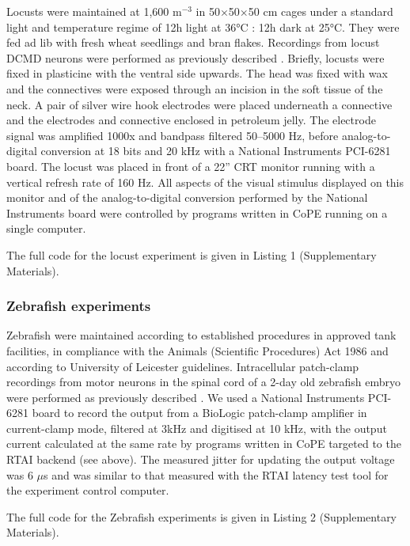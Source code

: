 Locusts were maintained at 1,600 m$^{-3}$ in 50$\times$50$\times$50 cm cages under a
standard light and temperature regime of 12h light at 36°C : 12h dark
at 25°C. They were fed ad lib with fresh wheat seedlings and bran
flakes. Recordings from locust DCMD neurons were performed as
previously described \citep{Matheson2004}. Briefly, locusts were fixed
in plasticine with the ventral side upwards. The head was fixed with
wax
and the connectives were exposed through an
incision in the soft tissue of the neck. A pair of silver wire hook
electrodes were placed underneath a connective and the electrodes
and connective enclosed in petroleum jelly. The electrode signal was
amplified 1000x and bandpass filtered 50--5000 Hz, before
analog-to-digital conversion at 18 bits and 20 kHz with a National
Instruments PCI-6281 board. The locust was placed in front of a 22''
CRT monitor running with a vertical refresh rate of 160 Hz. All
aspects of the visual stimulus displayed on this monitor and of
the analog-to-digital conversion performed by the National Instruments
board were controlled by programs written in
CoPE running on a single computer.

The full code for the locust experiment is given in Listing 1
(Supplementary Materials).

\subsubsection*{Zebrafish experiments}

Zebrafish were maintained according to established procedures
\citep{Westerfield1994} in approved tank facilities, in compliance
with the Animals (Scientific Procedures) Act 1986 and according to
University of Leicester guidelines. Intracellular patch-clamp
recordings from motor neurons in the spinal cord of a 2-day old
zebrafish embryo were performed as previously described
\citep{McDearmid2006}. We used a National Instruments PCI-6281 board
to record the output from a BioLogic patch-clamp amplifier in
current-clamp mode, filtered at 3kHz and digitised at 10 kHz, with the
output current calculated at the same rate by programs written in
CoPE targeted to the RTAI backend (see
above). The measured jitter for updating the output voltage was 6
$\mu$s and was similar to that measured with the RTAI latency test
tool for the experiment control computer.

The full code for the Zebrafish experiments is given in Listing 2
(Supplementary Materials).

